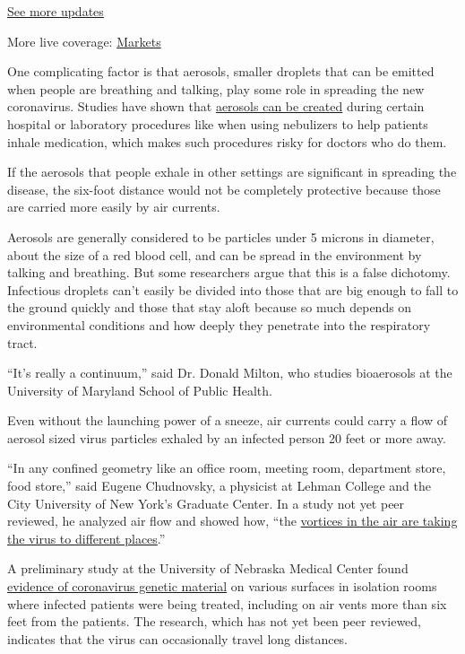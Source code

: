\href{https://www.nytimes.com/2020/08/17/world/covid-19-coronavirus.html?action=click\&pgtype=Article\&state=default\&region=MAIN_CONTENT_1\&context=storylines_live_updates}{See
more updates}

More live coverage:
\href{https://www.nytimes.com/live/2020/08/17/business/stock-market-today-coronavirus?action=click\&pgtype=Article\&state=default\&region=MAIN_CONTENT_1\&context=storylines_live_updates}{Markets}

One complicating factor is that aerosols, smaller droplets that can be
emitted when people are breathing and talking, play some role in
spreading the new coronavirus. Studies have shown that
\href{https://www.nejm.org/doi/10.1056/NEJMc2004973}{aerosols can be
created} during certain hospital or laboratory procedures like when
using nebulizers to help patients inhale medication, which makes such
procedures risky for doctors who do them.

If the aerosols that people exhale in other settings are significant in
spreading the disease, the six-foot distance would not be completely
protective because those are carried more easily by air currents.

Aerosols are generally considered to be particles under 5 microns in
diameter, about the size of a red blood cell, and can be spread in the
environment by talking and breathing. But some researchers argue that
this is a false dichotomy. Infectious droplets can't easily be divided
into those that are big enough to fall to the ground quickly and those
that stay aloft because so much depends on environmental conditions and
how deeply they penetrate into the respiratory tract.

``It's really a continuum,'' said Dr. Donald Milton, who studies
bioaerosols at the University of Maryland School of Public Health.

Even without the launching power of a sneeze, air currents could carry a
flow of aerosol sized virus particles exhaled by an infected person 20
feet or more away.

``In any confined geometry like an office room, meeting room, department
store, food store,'' said Eugene Chudnovsky, a physicist at Lehman
College and the City University of New York's Graduate Center. In a
study not yet peer reviewed, he analyzed air flow and showed how, ``the
\href{https://arxiv.org/abs/2003.13689}{vortices in the air are taking
the virus to different places}.''

A preliminary study at the University of Nebraska Medical Center found
\href{https://www.medrxiv.org/content/10.1101/2020.03.23.20039446v2}{evidence
of coronavirus genetic material} on various surfaces in isolation rooms
where infected patients were being treated, including on air vents more
than six feet from the patients. The research, which has not yet been
peer reviewed, indicates that the virus can occasionally travel long
distances.

